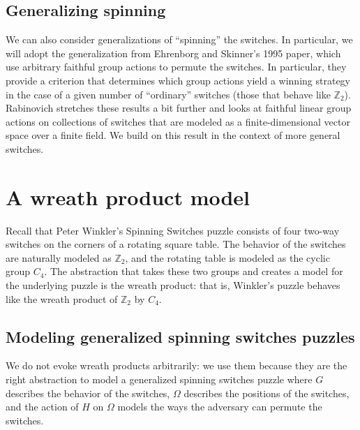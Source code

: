 
\subsection{Generalizing spinning}
We can also consider generalizations of ``spinning'' the switches.
In particular, we will adopt the generalization from
Ehrenborg and Skinner's \cite{Ehrenborg1995} 1995 paper, which use
arbitrary faithful group actions to permute the switches.
In particular, they provide a criterion that determines which group actions
yield a winning strategy in the case of a given number of ``ordinary'' switches
(those that behave like $\mathbb Z_2$).
Rabinovich \cite{Rabinovich2022} stretches these results a bit further and
looks at faithful linear group actions on collections of switches that
are modeled as a finite-dimensional vector space over a finite field.
We build on this result in the context of more general switches.

\section{A wreath product model}
\label{sec:WreathModel}
Recall that Peter Winkler's Spinning Switches puzzle consists of four two-way
switches on the corners of a rotating square table.
The behavior of the switches are naturally modeled as $\mathbb Z_2$, and
the rotating table is modeled as the cyclic group $C_4$.
The abstraction that takes these two groups and creates a model for the
underlying puzzle is the wreath product: that is, Winkler's puzzle behaves like
the wreath product of $\mathbb Z_2$ by $C_4$.

\subsection{Modeling generalized spinning switches puzzles}
We do not evoke wreath products arbitrarily: we use them because they are the
right abstraction to model a generalized spinning switches puzzle where
$G$ describes the behavior of the switches,
$\Omega$ describes the positions of the switches, and
the action of $H$ on $\Omega$ models the ways the adversary can permute the switches.

